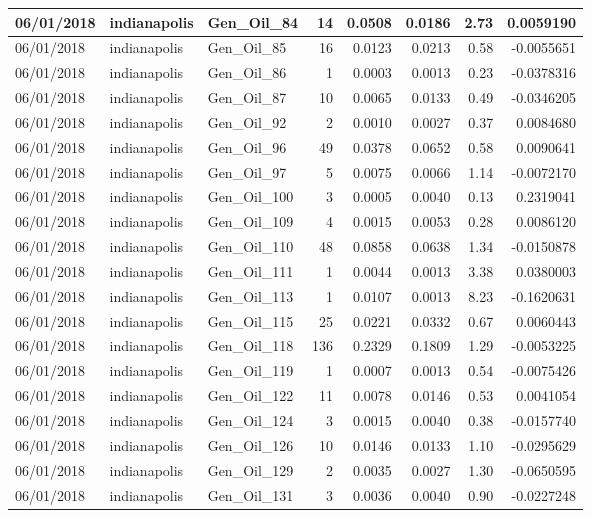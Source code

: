 \documentclass[
  letterpaper,
  DIV=11,
  numbers=noendperiod]{scrartcl}
\begin{document}
\begin{tabular}{l|l|l|r|r|r|r|r}
\hline
06/01/2018 & indianapolis & Gen\_Oil\_84 & 14 & 0.0508 & 0.0186 & 2.73 & 0.0059190\\
\hline
06/01/2018 & indianapolis & Gen\_Oil\_85 & 16 & 0.0123 & 0.0213 & 0.58 & -0.0055651\\
\hline
06/01/2018 & indianapolis & Gen\_Oil\_86 & 1 & 0.0003 & 0.0013 & 0.23 & -0.0378316\\
\hline
06/01/2018 & indianapolis & Gen\_Oil\_87 & 10 & 0.0065 & 0.0133 & 0.49 & -0.0346205\\
\hline
06/01/2018 & indianapolis & Gen\_Oil\_92 & 2 & 0.0010 & 0.0027 & 0.37 & 0.0084680\\
\hline
06/01/2018 & indianapolis & Gen\_Oil\_96 & 49 & 0.0378 & 0.0652 & 0.58 & 0.0090641\\
\hline
06/01/2018 & indianapolis & Gen\_Oil\_97 & 5 & 0.0075 & 0.0066 & 1.14 & -0.0072170\\
\hline
06/01/2018 & indianapolis & Gen\_Oil\_100 & 3 & 0.0005 & 0.0040 & 0.13 & 0.2319041\\
\hline
06/01/2018 & indianapolis & Gen\_Oil\_109 & 4 & 0.0015 & 0.0053 & 0.28 & 0.0086120\\
\hline
06/01/2018 & indianapolis & Gen\_Oil\_110 & 48 & 0.0858 & 0.0638 & 1.34 & -0.0150878\\
\hline
06/01/2018 & indianapolis & Gen\_Oil\_111 & 1 & 0.0044 & 0.0013 & 3.38 & 0.0380003\\
\hline
06/01/2018 & indianapolis & Gen\_Oil\_113 & 1 & 0.0107 & 0.0013 & 8.23 & -0.1620631\\
\hline
06/01/2018 & indianapolis & Gen\_Oil\_115 & 25 & 0.0221 & 0.0332 & 0.67 & 0.0060443\\
\hline
06/01/2018 & indianapolis & Gen\_Oil\_118 & 136 & 0.2329 & 0.1809 & 1.29 & -0.0053225\\
\hline
06/01/2018 & indianapolis & Gen\_Oil\_119 & 1 & 0.0007 & 0.0013 & 0.54 & -0.0075426\\
\hline
06/01/2018 & indianapolis & Gen\_Oil\_122 & 11 & 0.0078 & 0.0146 & 0.53 & 0.0041054\\
\hline
06/01/2018 & indianapolis & Gen\_Oil\_124 & 3 & 0.0015 & 0.0040 & 0.38 & -0.0157740\\
\hline
06/01/2018 & indianapolis & Gen\_Oil\_126 & 10 & 0.0146 & 0.0133 & 1.10 & -0.0295629\\
\hline
06/01/2018 & indianapolis & Gen\_Oil\_129 & 2 & 0.0035 & 0.0027 & 1.30 & -0.0650595\\
\hline
06/01/2018 & indianapolis & Gen\_Oil\_131 & 3 & 0.0036 & 0.0040 & 0.90 & -0.0227248\\

\end{tabular}
\end{document}
